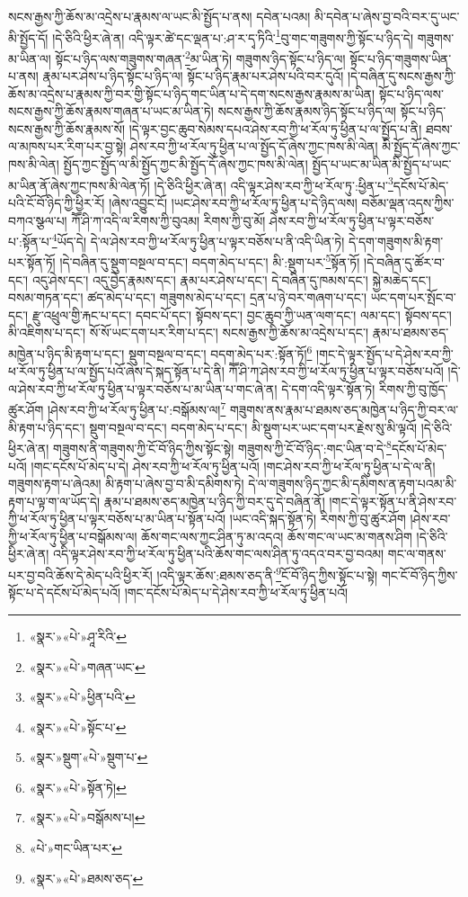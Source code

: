སངས་རྒྱས་ཀྱི་ཆོས་མ་འདྲེས་པ་རྣམས་ལ་ཡང་མི་སྤྱོད་པ་ནས། དབེན་པའམ། མི་དབེན་པ་ཞེས་བྱ་བའི་བར་དུ་ཡང་མི་སྤྱོད་དོ། །དེ་ཅིའི་ཕྱིར་ཞེ་ན། འདི་ལྟར་ཚེ་དང་ལྡན་པ་:ཤ་ར་དྭ་ཏིའི་\footnote{«སྣར་»«པེ་»ཤཱ་རིའི་}བུ་གང་གཟུགས་ཀྱི་སྟོང་པ་ཉིད་དེ། གཟུགས་མ་ཡིན་ལ། སྟོང་པ་ཉིད་ལས་གཟུགས་གཞན་\footnote{«སྣར་»«པེ་»གཞན་ཡང་}མ་ཡིན་ཏེ། གཟུགས་ཉིད་སྟོང་པ་ཉིད་ལ། སྟོང་པ་ཉིད་གཟུགས་ཡིན་པ་ནས། རྣམ་པར་ཤེས་པ་ཉིད་སྟོང་པ་ཉིད་ལ། སྟོང་པ་ཉིད་རྣམ་པར་ཤེས་པའི་བར་དུའོ། །དེ་བཞིན་དུ་སངས་རྒྱས་ཀྱི་ཆོས་མ་འདྲེས་པ་རྣམས་ཀྱི་བར་གྱི་སྟོང་པ་ཉིད་གང་ཡིན་པ་དེ་དག་སངས་རྒྱས་རྣམས་མ་ཡིན། སྟོང་པ་ཉིད་ལས་སངས་རྒྱས་ཀྱི་ཆོས་རྣམས་གཞན་པ་ཡང་མ་ཡིན་ཏེ། སངས་རྒྱས་ཀྱི་ཆོས་རྣམས་ཉིད་སྟོང་པ་ཉིད་ལ། སྟོང་པ་ཉིད་སངས་རྒྱས་ཀྱི་ཆོས་རྣམས་སོ། །དེ་ལྟར་བྱང་ཆུབ་སེམས་དཔའ་ཤེས་རབ་ཀྱི་ཕ་རོལ་ཏུ་ཕྱིན་པ་ལ་སྤྱོད་པ་ནི། ཐབས་ལ་མཁས་པར་རིག་པར་བྱ་སྟེ། ཤེས་རབ་ཀྱི་ཕ་རོལ་ཏུ་ཕྱིན་པ་ལ་སྤྱོད་དོ་ཞེས་ཀྱང་ཁས་མི་ལེན། མི་སྤྱོད་དོ་ཞེས་ཀྱང་ཁས་མི་ལེན། སྤྱོད་ཀྱང་སྤྱོད་ལ་མི་སྤྱོད་ཀྱང་མི་སྤྱོད་དོ་ཞེས་ཀྱང་ཁས་མི་ལེན། སྤྱོད་པ་ཡང་མ་ཡིན་མི་སྤྱོད་པ་ཡང་མ་ཡིན་ནོ་ཞེས་ཀྱང་ཁས་མི་ལེན་ཏོ། །དེ་ཅིའི་ཕྱིར་ཞེ་ན། འདི་ལྟར་ཤེས་རབ་ཀྱི་ཕ་རོལ་ཏུ་:ཕྱིན་པ་\footnote{«སྣར་»«པེ་»ཕྱིན་པའི་}དངོས་པོ་མེད་པའི་ངོ་བོ་ཉིད་ཀྱི་ཕྱིར་རོ། །ཞེས་འབྱུང་ངོ། །ཡང་ཤེས་རབ་ཀྱི་ཕ་རོལ་ཏུ་ཕྱིན་པ་དེ་ཉིད་ལས། བཅོམ་ལྡན་འདས་ཀྱིས་བཀའ་སྩལ་པ། ཀཽ་ཤི་ཀ་འདི་ལ་རིགས་ཀྱི་བུའམ། རིགས་ཀྱི་བུ་མོ། ཤེས་རབ་ཀྱི་ཕ་རོལ་ཏུ་ཕྱིན་པ་ལྟར་བཅོས་པ་:སྟོན་པ་\footnote{«སྣར་»«པེ་»སྟོང་པ་}ཡོད་དེ། དེ་ལ་ཤེས་རབ་ཀྱི་ཕ་རོལ་ཏུ་ཕྱིན་པ་ལྟར་བཅོས་པ་ནི་འདི་ཡིན་ཏེ། དེ་དག་གཟུགས་མི་རྟག་པར་སྟོན་ཏོ། །དེ་བཞིན་དུ་སྡུག་བསྔལ་བ་དང་། བདག་མེད་པ་དང་། མི་:སྡུག་པར་\footnote{«སྣར་»སྡུག་«པེ་»སྡུག་པ་}སྟོན་ཏོ། །དེ་བཞིན་དུ་ཚོར་བ་དང་། འདུ་ཤེས་དང་། འདུ་བྱེད་རྣམས་དང་། རྣམ་པར་ཤེས་པ་དང་། དེ་བཞིན་དུ་ཁམས་དང་། སྐྱེ་མཆེད་དང་། བསམ་གཏན་དང་། ཚད་མེད་པ་དང་། གཟུགས་མེད་པ་དང་། དྲན་པ་ཉེ་བར་གཞག་པ་དང་། ཡང་དག་པར་སྤོང་བ་དང་། རྫུ་འཕྲུལ་གྱི་རྐང་པ་དང་། དབང་པོ་དང་། སྟོབས་དང་། བྱང་ཆུབ་ཀྱི་ཡན་ལག་དང་། ལམ་དང་། སྟོབས་དང་། མི་འཇིགས་པ་དང་། སོ་སོ་ཡང་དག་པར་རིག་པ་དང་། སངས་རྒྱས་ཀྱི་ཆོས་མ་འདྲེས་པ་དང་། རྣམ་པ་ཐམས་ཅད་མཁྱེན་པ་ཉིད་མི་རྟག་པ་དང་། སྡུག་བསྔལ་བ་དང་། བདག་མེད་པར་:སྟོན་ཏོ།\footnote{«སྣར་»«པེ་»སྟོན་ཏེ།} །གང་དེ་ལྟར་སྤྱོད་པ་དེ་ཤེས་རབ་ཀྱི་ཕ་རོལ་ཏུ་ཕྱིན་པ་ལ་སྤྱོད་པའོ་ཞེས་དེ་སྐད་སྟོན་པ་དེ་ནི། ཀཽ་ཤི་ཀ་ཤེས་རབ་ཀྱི་ཕ་རོལ་ཏུ་ཕྱིན་པ་ལྟར་བཅོས་པའོ། །དེ་ལ་ཤེས་རབ་ཀྱི་ཕ་རོལ་ཏུ་ཕྱིན་པ་ལྟར་བཅོས་པ་མ་ཡིན་པ་གང་ཞེ་ན། དེ་དག་འདི་ལྟར་སྟོན་ཏེ། རིགས་ཀྱི་བུ་ཁྱོད་ཚུར་ཤོག །ཤེས་རབ་ཀྱི་ཕ་རོལ་ཏུ་ཕྱིན་པ་:བསྒོམས་ལ།\footnote{«སྣར་»«པེ་»བསྒོམས་པ།} གཟུགས་ནས་རྣམ་པ་ཐམས་ཅད་མཁྱེན་པ་ཉིད་ཀྱི་བར་ལ་མི་རྟག་པ་ཉིད་དང་། སྡུག་བསྔལ་བ་དང་། བདག་མེད་པ་དང་། མི་སྡུག་པར་ཡང་དག་པར་རྗེས་སུ་མི་ལྟའོ། །དེ་ཅིའི་ཕྱིར་ཞེ་ན། གཟུགས་ནི་གཟུགས་ཀྱི་ངོ་བོ་ཉིད་ཀྱིས་སྟོང་སྟེ། གཟུགས་ཀྱི་ངོ་བོ་ཉིད་:གང་ཡིན་བ་དེ་\footnote{«པེ་»གང་ཡིན་པར་}དངོས་པོ་མེད་པའོ། །གང་དངོས་པོ་མེད་པ་དེ། ཤེས་རབ་ཀྱི་ཕ་རོལ་ཏུ་ཕྱིན་པའོ། །གང་ཤེས་རབ་ཀྱི་ཕ་རོལ་ཏུ་ཕྱིན་པ་དེ་ལ་ནི། གཟུགས་རྟག་པ་ཞེའམ། མི་རྟག་པ་ཞེས་བྱ་བ་མི་དམིགས་ཏེ། དེ་ལ་གཟུགས་ཉིད་ཀྱང་མི་དམིགས་ན་རྟག་པའམ་མི་རྟག་པ་ལྟ་ག་ལ་ཡོད་དེ། རྣམ་པ་ཐམས་ཅད་མཁྱེན་པ་ཉིད་ཀྱི་བར་དུ་དེ་བཞིན་ནོ། །གང་དེ་ལྟར་སྟོན་པ་ནི་ཤེས་རབ་ཀྱི་ཕ་རོལ་ཏུ་ཕྱིན་པ་ལྟར་བཅོས་པ་མ་ཡིན་པ་སྟོན་པའོ། །ཡང་འདི་སྐད་སྟོན་ཏེ། རིགས་ཀྱི་བུ་ཚུར་ཤོག །ཤེས་རབ་ཀྱི་ཕ་རོལ་ཏུ་ཕྱིན་པ་བསྒོམས་ལ། ཆོས་གང་ལས་ཀྱང་ཤིན་ཏུ་མ་འདའ། ཆོས་གང་ལ་ཡང་མ་གནས་ཤིག །དེ་ཅིའི་ཕྱིར་ཞེ་ན། འདི་ལྟར་ཤེས་རབ་ཀྱི་ཕ་རོལ་ཏུ་ཕྱིན་པའི་ཆོས་གང་ལས་ཤིན་ཏུ་འདའ་བར་བྱ་བའམ། གང་ལ་གནས་པར་བྱ་བའི་ཆོས་དེ་མེད་པའི་ཕྱིར་རོ། །འདི་ལྟར་ཆོས་:ཐམས་ཅད་ནི་\footnote{«སྣར་»«པེ་»ཐམས་ཅད་}ངོ་བོ་ཉིད་ཀྱིས་སྟོང་པ་སྟེ། གང་ངོ་བོ་ཉིད་ཀྱིས་སྟོང་པ་དེ་དངོས་པོ་མེད་པའོ། །གང་དངོས་པོ་མེད་པ་དེ་ཤེས་རབ་ཀྱི་ཕ་རོལ་ཏུ་ཕྱིན་པའོ། 